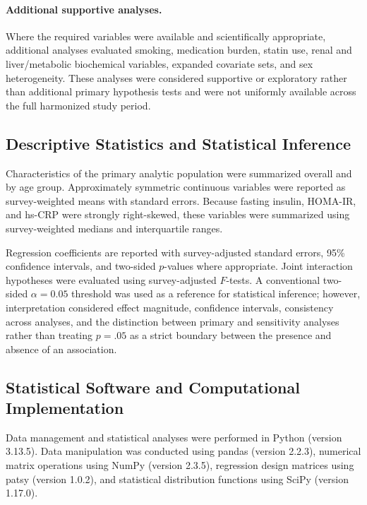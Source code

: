 \documentclass[11pt]{article}
\begin{document}
\paragraph{Additional supportive analyses.}
Where the required variables were available and scientifically appropriate,
additional analyses evaluated smoking, medication burden, statin use,
renal and liver/metabolic biochemical variables, expanded covariate sets,
and sex heterogeneity. These analyses were considered supportive or
exploratory rather than additional primary hypothesis tests and were not
uniformly available across the full harmonized study period.


\subsection{Descriptive Statistics and Statistical Inference}

Characteristics of the primary analytic population were summarized overall
and by age group. Approximately symmetric continuous variables were
reported as survey-weighted means with standard errors. Because fasting
insulin, HOMA-IR, and hs-CRP were strongly right-skewed, these variables
were summarized using survey-weighted medians and interquartile ranges.

Regression coefficients are reported with survey-adjusted standard errors,
95\% confidence intervals, and two-sided $p$-values where appropriate.
Joint interaction hypotheses were evaluated using survey-adjusted $F$-tests.
A conventional two-sided $\alpha=0.05$ threshold was used as a reference
for statistical inference; however, interpretation considered effect
magnitude, confidence intervals, consistency across analyses, and the
distinction between primary and sensitivity analyses rather than treating
$p=.05$ as a strict boundary between the presence and absence of an
association.


\subsection{Statistical Software and Computational Implementation}

Data management and statistical analyses were performed in Python
(version 3.13.5). Data manipulation was conducted using pandas
(version 2.2.3), numerical matrix operations using NumPy
(version 2.3.5), regression design matrices using patsy
(version 1.0.2), and statistical distribution functions using SciPy
(version 1.17.0).
\end{document}
